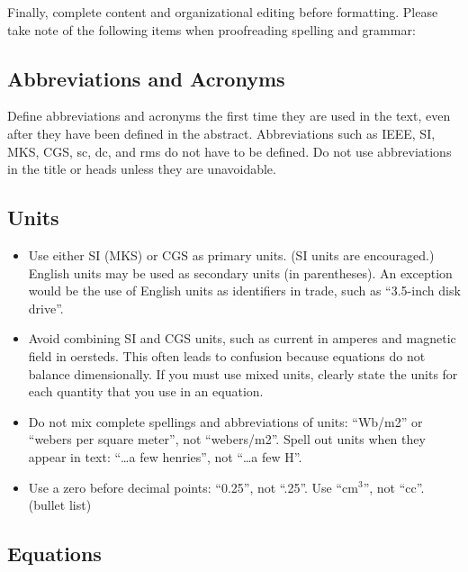 \documentclass[letterpaper, 12 pt, conference]{ieeeconf}  %
\begin{document}
Finally, complete content and organizational editing before formatting. Please take note of the following items when proofreading spelling and grammar:

\subsection{Abbreviations and Acronyms} Define abbreviations and acronyms the first time they are used in the text, even after they have been defined in the abstract. Abbreviations such as IEEE, SI, MKS, CGS, sc, dc, and rms do not have to be defined. Do not use abbreviations in the title or heads unless they are unavoidable.

\subsection{Units}

\begin{itemize}

\item Use either SI (MKS) or CGS as primary units. (SI units are encouraged.) English units may be used as secondary units (in parentheses). An exception would be the use of English units as identifiers in trade, such as ``3.5-inch disk drive''.
\item Avoid combining SI and CGS units, such as current in amperes and magnetic field in oersteds. This often leads to confusion because equations do not balance dimensionally. If you must use mixed units, clearly state the units for each quantity that you use in an equation.
\item Do not mix complete spellings and abbreviations of units: ``Wb/m2'' or ``webers per square meter'', not ``webers/m2''.  Spell out units when they appear in text: ``\ldots a few henries'', not ``\ldots a few H''.
\item Use a zero before decimal points: ``0.25'', not ``.25''. Use ``cm$^3$'', not ``cc''. (bullet list)

\end{itemize}


\subsection{Equations}
\end{document}
